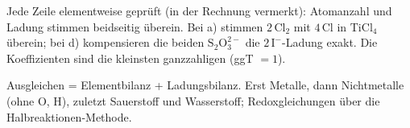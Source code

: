 \begin{kontrolle}
Jede Zeile elementweise geprüft (in der Rechnung vermerkt): Atomanzahl und
Ladung stimmen beidseitig überein. Bei a) stimmen $2\,\mathrm{Cl_2}$ mit
$4\,\mathrm{Cl}$ in $\mathrm{TiCl_4}$ überein; bei d) kompensieren die beiden
$\mathrm{S_2O_3^{2-}}$ die $2\,\mathrm{I^-}$-Ladung exakt. Die Koeffizienten
sind die kleinsten ganzzahligen (ggT $=1$).
\end{kontrolle}

\begin{merksatz}
Ausgleichen = Elementbilanz + Ladungsbilanz. Erst Metalle, dann Nichtmetalle
(ohne O, H), zuletzt Sauerstoff und Wasserstoff; Redoxgleichungen über die
Halbreaktionen-Methode.
\end{merksatz}
